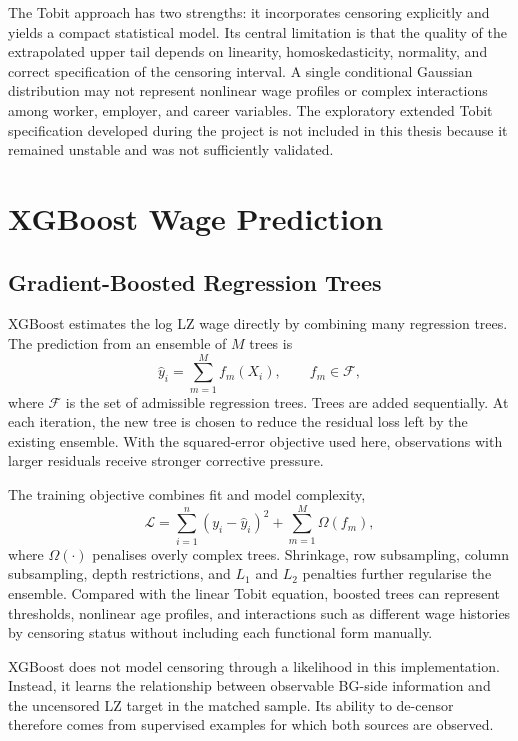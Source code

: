 \documentclass[12pt,a4paper,oneside,titlepage]{book}
\begin{document}
The Tobit approach has two strengths: it incorporates censoring explicitly and yields a compact statistical model. Its central limitation is that the quality of the extrapolated upper tail depends on linearity, homoskedasticity, normality, and correct specification of the censoring interval. A single conditional Gaussian distribution may not represent nonlinear wage profiles or complex interactions among worker, employer, and career variables. The exploratory extended Tobit specification developed during the project is not included in this thesis because it remained unstable and was not sufficiently validated.

\section{XGBoost Wage Prediction}
\label{sec:xgboost}

\subsection{Gradient-Boosted Regression Trees}
XGBoost estimates the log LZ wage directly by combining many regression trees. The prediction from an ensemble of $M$ trees is
\begin{equation}
  \widehat y_i=\sum_{m=1}^{M} f_m(X_i),
  \qquad f_m\in\mathcal{F},
\end{equation}
where $\mathcal{F}$ is the set of admissible regression trees. Trees are added sequentially. At each iteration, the new tree is chosen to reduce the residual loss left by the existing ensemble. With the squared-error objective used here, observations with larger residuals receive stronger corrective pressure.

The training objective combines fit and model complexity,
\begin{equation}
  \mathcal{L}=\sum_{i=1}^{n}(y_i-\widehat y_i)^2
  +\sum_{m=1}^{M}\Omega(f_m),
\end{equation}
where $\Omega(\cdot)$ penalises overly complex trees. Shrinkage, row subsampling, column subsampling, depth restrictions, and $L_1$ and $L_2$ penalties further regularise the ensemble. Compared with the linear Tobit equation, boosted trees can represent thresholds, nonlinear age profiles, and interactions such as different wage histories by censoring status without including each functional form manually.

XGBoost does not model censoring through a likelihood in this implementation. Instead, it learns the relationship between observable BG-side information and the uncensored LZ target in the matched sample. Its ability to de-censor therefore comes from supervised examples for which both sources are observed.
\end{document}
